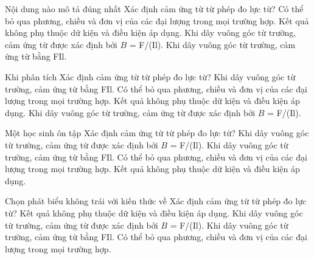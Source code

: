 \begin{ex}
Nội dung nào mô tả đúng nhất Xác định cảm ứng từ từ phép đo lực từ?
\choice
{Có thể bỏ qua phương, chiều và đơn vị của các đại lượng trong mọi trường hợp.}
{Kết quả không phụ thuộc dữ kiện và điều kiện áp dụng.}
{\True Khi dây vuông góc từ trường, cảm ứng từ được xác định bởi $B$ = F/(Il).}
{Khi dây vuông góc từ trường, cảm ứng từ bằng FIl.}
\end{ex}

\begin{ex}
Khi phân tích Xác định cảm ứng từ từ phép đo lực từ?
\choice
{Khi dây vuông góc từ trường, cảm ứng từ bằng FIl.}
{Có thể bỏ qua phương, chiều và đơn vị của các đại lượng trong mọi trường hợp.}
{Kết quả không phụ thuộc dữ kiện và điều kiện áp dụng.}
{\True Khi dây vuông góc từ trường, cảm ứng từ được xác định bởi $B$ = F/(Il).}
\end{ex}

\begin{ex}
Một học sinh ôn tập Xác định cảm ứng từ từ phép đo lực từ?
\choice
{\True Khi dây vuông góc từ trường, cảm ứng từ được xác định bởi $B$ = F/(Il).}
{Khi dây vuông góc từ trường, cảm ứng từ bằng FIl.}
{Có thể bỏ qua phương, chiều và đơn vị của các đại lượng trong mọi trường hợp.}
{Kết quả không phụ thuộc dữ kiện và điều kiện áp dụng.}
\end{ex}

\begin{ex}
Chọn phát biểu không trái với kiến thức về Xác định cảm ứng từ từ phép đo lực từ?
\choice
{Kết quả không phụ thuộc dữ kiện và điều kiện áp dụng.}
{\True Khi dây vuông góc từ trường, cảm ứng từ được xác định bởi $B$ = F/(Il).}
{Khi dây vuông góc từ trường, cảm ứng từ bằng FIl.}
{Có thể bỏ qua phương, chiều và đơn vị của các đại lượng trong mọi trường hợp.}
\end{ex}

